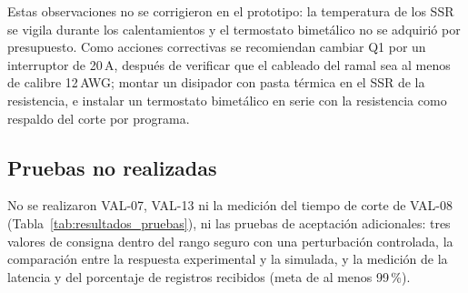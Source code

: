 Estas observaciones no se corrigieron en el prototipo: la temperatura de los SSR se vigila durante los calentamientos y el termostato bimetálico no se adquirió por presupuesto. Como acciones correctivas se recomiendan cambiar Q1 por un interruptor de 20\,A, después de verificar que el cableado del ramal sea al menos de calibre 12\,AWG; montar un disipador con pasta térmica en el SSR de la resistencia, e instalar un termostato bimetálico en serie con la resistencia como respaldo del corte por programa.

\subsection{Pruebas no realizadas}

No se realizaron VAL-07, VAL-13 ni la medición del tiempo de corte de VAL-08 (Tabla~\ref{tab:resultados_pruebas}), ni las pruebas de aceptación adicionales: tres valores de consigna dentro del rango seguro con una perturbación controlada, la comparación entre la respuesta experimental y la simulada, y la medición de la latencia y del porcentaje de registros recibidos (meta de al menos 99\,\%).